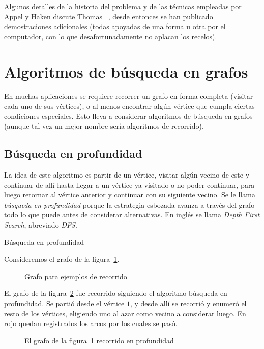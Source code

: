   Algunos detalles de la historia del problema
  y de las técnicas empleadas por Appel y Haken discute Thomas~%
    \cite{thomas98:_updates_four_color_theorem},
  desde entonces se han publicado demostraciones adicionales
  (todas apoyadas de una forma u otra por el computador,
   con lo que desafortunadamente no aplacan los recelos).

\section{Algoritmos de búsqueda en grafos}
\label{sec:busquedas}

  En muchas aplicaciones
  se requiere recorrer un grafo en forma completa
  (visitar cada uno de sus vértices),
  o al menos encontrar algún vértice
  que cumpla ciertas condiciones especiales.
  Esto lleva a considerar algoritmos de búsqueda en grafos
  (aunque tal vez un mejor nombre sería algoritmos de recorrido).

\subsection{Búsqueda en profundidad}
\label{sec:DFS}

  La idea de este algoritmo es partir de un vértice,
  visitar algún vecino de este y continuar de allí
  hasta llegar a un vértice ya visitado o no poder continuar,
  para luego retornar al vértice anterior
  y continuar con su siguiente vecino.
  Se le llama \emph{búsqueda en profundidad}
  porque la estrategia esbozada avanza a través del grafo
  todo lo que puede antes de considerar alternativas.
  En inglés
  se llama \emph{\foreignlanguage{english}{Depth First Search}},%
  abreviado \emph{DFS}.
  \begin{example}
    Búsqueda en profundidad

    Consideremos el grafo de la figura~\ref{fig:a-recorrer}.
    \begin{figure}[htbp]
      \centering
      \caption{Grafo para ejemplos de recorrido}
      \label{fig:a-recorrer}
    \end{figure}
    El grafo de la figura~\ref{fig:DFS}
    fue recorrido siguiendo el algoritmo búsqueda en profundidad.
    Se partió desde el vértice \(1\),
    y desde allí se recorrió y enumeró el resto de los vértices,
    eligiendo uno al azar como vecino a considerar luego.
    En rojo quedan registrados los arcos por los cuales se pasó.
    \begin{figure}
      \centering
      \caption{El grafo de la figura~\ref{fig:a-recorrer}
	       recorrido en profundidad}
      \label{fig:DFS}
    \end{figure}
  \end{example}

